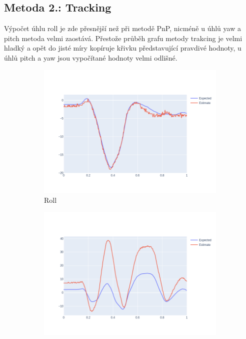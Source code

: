 \documentclass[12pt,a4paper,titlepage,final]{report}
\begin{document}
\subsection{Metoda 2.: Tracking}
Výpočet úhlu roll je zde přesnější než při metodě PnP, nicméně u úhlů yaw a pitch metoda velmi zaostává. Přestože průběh grafu metody trakcing je velmi hladký a opět do jisté míry kopíruje křivku představující pravdivé hodnoty, u úhlů pitch a yaw jsou vypočítané hodnoty velmi odlišné. 
\begin{figure}[!h]
  \centering
  \captionsetup{justification=centering}
  \begin{subfigure}[b]{0.32\textwidth}
    \includegraphics[width=\textwidth]{images/evaluation/tracking_roll_user_01_video_07.png}
   \caption{Roll}
    \label{fig:track_roll}
  \end{subfigure}
  \hfill
  \begin{subfigure}[b]{0.32\textwidth}
    \includegraphics[width=\textwidth]{images/evaluation/tracking_yaw_user_01_video_07.png}

\end{subfigure}
\end{figure}
\end{document}
